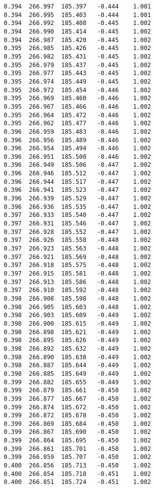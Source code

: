 \begin{verbatim}
   0.394  266.997  185.397   -0.444    1.001
   0.394  266.995  185.403   -0.444    1.001
   0.394  266.992  185.408   -0.445    1.002
   0.394  266.990  185.414   -0.445    1.002
   0.394  266.987  185.420   -0.445    1.002
   0.395  266.985  185.426   -0.445    1.002
   0.395  266.982  185.431   -0.445    1.002
   0.395  266.979  185.437   -0.445    1.002
   0.395  266.977  185.443   -0.445    1.002
   0.395  266.974  185.449   -0.445    1.002
   0.395  266.972  185.454   -0.446    1.002
   0.395  266.969  185.460   -0.446    1.002
   0.395  266.967  185.466   -0.446    1.002
   0.395  266.964  185.472   -0.446    1.002
   0.395  266.962  185.477   -0.446    1.002
   0.396  266.959  185.483   -0.446    1.002
   0.396  266.956  185.489   -0.446    1.002
   0.396  266.954  185.494   -0.446    1.002
   0.396  266.951  185.500   -0.446    1.002
   0.396  266.949  185.506   -0.447    1.002
   0.396  266.946  185.512   -0.447    1.002
   0.396  266.944  185.517   -0.447    1.002
   0.396  266.941  185.523   -0.447    1.002
   0.396  266.939  185.529   -0.447    1.002
   0.396  266.936  185.535   -0.447    1.002
   0.397  266.933  185.540   -0.447    1.002
   0.397  266.931  185.546   -0.447    1.002
   0.397  266.928  185.552   -0.447    1.002
   0.397  266.926  185.558   -0.448    1.002
   0.397  266.923  185.563   -0.448    1.002
   0.397  266.921  185.569   -0.448    1.002
   0.397  266.918  185.575   -0.448    1.002
   0.397  266.915  185.581   -0.448    1.002
   0.397  266.913  185.586   -0.448    1.002
   0.397  266.910  185.592   -0.448    1.002
   0.398  266.908  185.598   -0.448    1.002
   0.398  266.905  185.603   -0.448    1.002
   0.398  266.903  185.609   -0.449    1.002
   0.398  266.900  185.615   -0.449    1.002
   0.398  266.898  185.621   -0.449    1.002
   0.398  266.895  185.626   -0.449    1.002
   0.398  266.892  185.632   -0.449    1.002
   0.398  266.890  185.638   -0.449    1.002
   0.398  266.887  185.644   -0.449    1.002
   0.398  266.885  185.649   -0.449    1.002
   0.399  266.882  185.655   -0.449    1.002
   0.399  266.879  185.661   -0.450    1.002
   0.399  266.877  185.667   -0.450    1.002
   0.399  266.874  185.672   -0.450    1.002
   0.399  266.872  185.678   -0.450    1.002
   0.399  266.869  185.684   -0.450    1.002
   0.399  266.867  185.690   -0.450    1.002
   0.399  266.864  185.695   -0.450    1.002
   0.399  266.861  185.701   -0.450    1.002
   0.399  266.859  185.707   -0.450    1.002
   0.400  266.856  185.713   -0.450    1.002
   0.400  266.854  185.718   -0.451    1.002
   0.400  266.851  185.724   -0.451    1.002

\end{verbatim}
